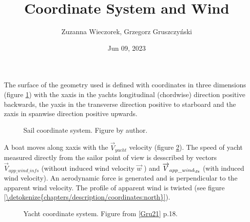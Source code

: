 \documentclass[a4paper,12pt,english]{jupyterBook}
\title{Coordinate System and Wind}
\date{Jun 09, 2023}
\author{Zuzanna Wieczorek, Grzegorz Gruszczyński}
\let\sphinxpxdimen\pdfpxdimen\else\newdimen\sphinxpxdimen
\begin{document}
\pagestyle{empty}
\sphinxmaketitle
\clearpage

\pagestyle{plain}
\sphinxtableofcontents
\pagestyle{normal}
\label{\detokenize{chapters/description/coordinates::doc}}


\sphinxAtStartPar
The surface of the geometry used is defined with coordinates in three dimensions (figure \hyperref[\detokenize{chapters/description/coordinates:geoms}]{\ref{\detokenize{chapters/description/coordinates:geoms}}})  with the x\sphinxhyphen{}axis in the yachts longitudinal (chordwise) direction positive backwards, the y\sphinxhyphen{}axis in the transverse direction positive to starboard and the z\sphinxhyphen{}axis in spanwise direction positive upwards.

\begin{figure}[htbp]
\centering
\capstart

\noindent\sphinxincludegraphics[height=500\sphinxpxdimen]{{geom}.png}
\caption{Sail coordinate system. Figure by author.}\label{\detokenize{chapters/description/coordinates:geoms}}\end{figure}

\sphinxAtStartPar
A boat moves along x\sphinxhyphen{}axis with the \(\overrightarrow{V}_{yacht}\) velocity (figure \hyperref[\detokenize{chapters/description/coordinates:coord-sys}]{\ref{\detokenize{chapters/description/coordinates:coord-sys}}}). The speed of yacht  measured directly from the sailor point of view is desscribed by vectors \(\overrightarrow{V}_{app\_wind\_infs}\) (without induced wind velocity \(\overrightarrow{w}\) ) and \(\overrightarrow{V}_{app\_wind_\fs}\) (with induced wind velocity). An aerodynamic force is generated and is  perpendicular to the apparent wind velocity. The profile of apparent wind is twisted (see figure \hyperref[\detokenize{chapters/description/coordinates:north}]{\ref{\detokenize{chapters/description/coordinates:north}}}).

\begin{figure}[htbp]
\centering
\capstart

\noindent\sphinxincludegraphics[height=500\sphinxpxdimen]{{coord_sys}.png}
\caption{Yacht coordinate system. Figure  from {[}\hyperlink{cite.chapters/bibliography:id7}{Gru21}{]} p.18.}\label{\detokenize{chapters/description/coordinates:coord-sys}}\end{figure}
\end{document}
